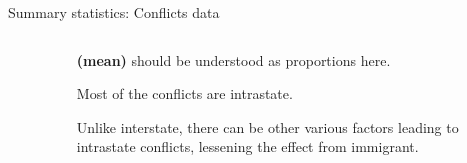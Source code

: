 \documentclass[notes,11pt, aspectratio=169]{beamer}
\newenvironment{wideitemize}{\itemize\addtolength{\itemsep}{10pt}}{\enditemize}
\begin{document}
\begin{frame}{Summary statistics: Conflicts data}
\begin{columns}
\begin{column}{0.5\textwidth}
\begin{figure}
	\centering
\end{figure}	
\end{column}
\begin{column}{0.5\textwidth}
	\begin{wideitemize}
	\item \textbf{(mean)} should be understood as proportions here.
	\item Most of the conflicts are intrastate.
	\item Unlike interstate, there can be other various factors leading to intrastate conflicts, lessening the effect from immigrant. 
	\end{wideitemize}	
\end{column}
\end{columns}
\end{frame}
\end{document}
